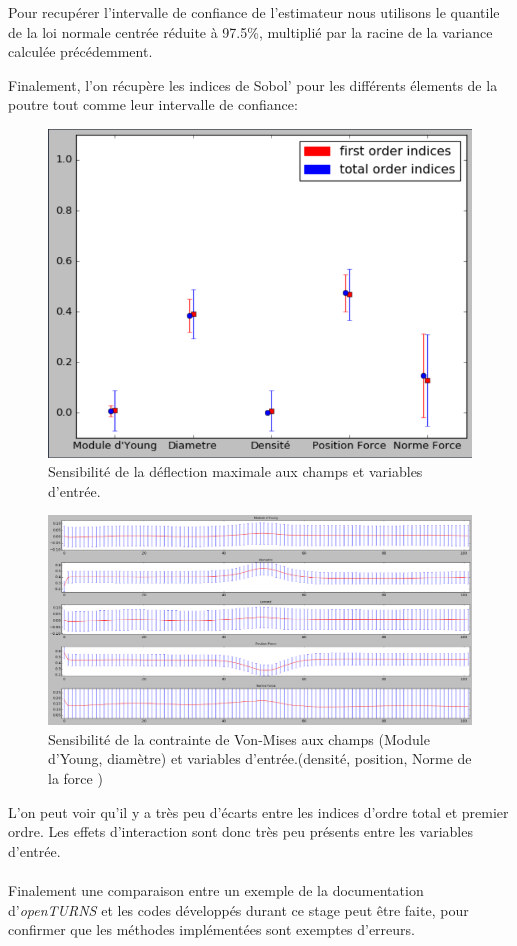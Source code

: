 \documentclass[a4paper,10pt]{article}
\begin{document}
Pour recupérer l'intervalle de confiance de l'estimateur nous utilisons le quantile de la loi normale centrée réduite à 97.5\%, multiplié par la racine de la variance calculée précédemment. 

Finalement, l'on récupère les indices de Sobol' pour les différents élements de la poutre tout comme leur intervalle de confiance: 



\begin{figure}[H]
   \centering   
   \includegraphics[scale=0.195]{sensibiliteDeflection10K.png}
      \caption{Sensibilité de la déflection maximale aux champs et variables d'entrée.}
         \label{MaxDeflec}
\end{figure}

\begin{figure}[H]
   \centering   
   \includegraphics[scale=0.255]{sensibiliteVonMises10K.png}
      \caption{Sensibilité de la contrainte de Von-Mises aux champs (Module d'Young, diamètre) et variables d'entrée.(densité, position, Norme de la force
      )}
         \label{VonMises}
\end{figure}
L'on peut voir qu'il y a très peu d'écarts entre les indices d'ordre total et premier ordre. Les effets d'interaction sont donc très peu présents entre les variables d'entrée.\\
\\
Finalement une comparaison entre un exemple de la documentation d'\textit{openTURNS} et les codes développés durant ce stage peut être faite, pour confirmer que les méthodes implémentées sont exemptes d'erreurs. 
\end{document}
